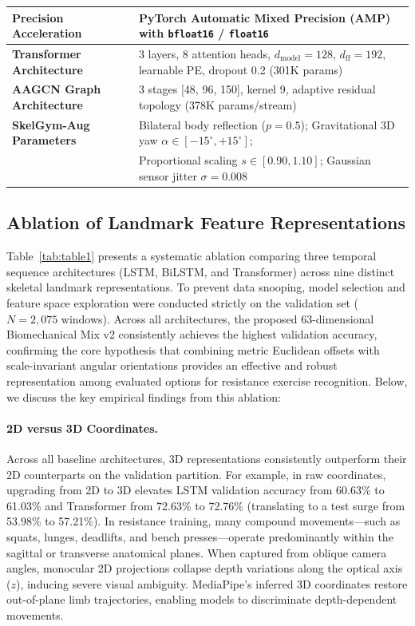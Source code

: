\documentclass[runningheads]{llncs}
\begin{document}
\begin{table}[!t]
{\begin{tabular}{l l}
\textbf{Precision Acceleration}    & PyTorch Automatic Mixed Precision (AMP) with \texttt{bfloat16} / \texttt{float16} \\
\midrule
\textbf{Transformer Architecture}  & 3 layers, 8 attention heads, $d_{\text{model}} = 128$, $d_{\text{ff}} = 192$, learnable PE, dropout 0.2 (301K params) \\
\textbf{AAGCN Graph Architecture}  & 3 stages [48, 96, 150], kernel 9, adaptive residual topology (378K params/stream) \\
\textbf{SkelGym-Aug Parameters}    & Bilateral body reflection ($p=0.5$); Gravitational 3D yaw $\alpha \in [-15^\circ, +15^\circ]$; \\
                                   & Proportional scaling $s \in [0.90, 1.10]$; Gaussian sensor jitter $\sigma = 0.008$ \\
\bottomrule
\end{tabular}
}
\end{table}

\subsection{Ablation of Landmark Feature Representations}
Table~\ref{tab:table1} presents a systematic ablation comparing three temporal sequence architectures (LSTM, BiLSTM, and Transformer) across nine distinct skeletal landmark representations. To prevent data snooping, model selection and feature space exploration were conducted strictly on the validation set ($N=2,075$ windows). Across all architectures, the proposed 63-dimensional Biomechanical Mix v2 consistently achieves the highest validation accuracy, confirming the core hypothesis that combining metric Euclidean offsets with scale-invariant angular orientations provides an effective and robust representation among evaluated options for resistance exercise recognition. Below, we discuss the key empirical findings from this ablation:

\paragraph{2D versus 3D Coordinates.} Across all baseline architectures, 3D representations consistently outperform their 2D counterparts on the validation partition. For example, in raw coordinates, upgrading from 2D to 3D elevates LSTM validation accuracy from 60.63\% to 61.03\% and Transformer from 72.63\% to 72.76\% (translating to a test surge from 53.98\% to 57.21\%). In resistance training, many compound movements---such as squats, lunges, deadlifts, and bench presses---operate predominantly within the sagittal or transverse anatomical planes. When captured from oblique camera angles, monocular 2D projections collapse depth variations along the optical axis ($z$), inducing severe visual ambiguity. MediaPipe's inferred 3D coordinates restore out-of-plane limb trajectories, enabling models to discriminate depth-dependent movements.
\end{document}
